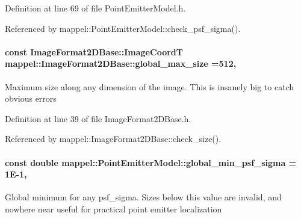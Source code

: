 Definition at line 69 of file Point\+Emitter\+Model.\+h.



Referenced by mappel\+::\+Point\+Emitter\+Model\+::check\+\_\+psf\+\_\+sigma().

\paragraph[{\texorpdfstring{global\+\_\+max\+\_\+size}{global_max_size}}]{\setlength{\rightskip}{0pt plus 5cm}const {\bf Image\+Format2\+D\+Base\+::\+Image\+CoordT} mappel\+::\+Image\+Format2\+D\+Base\+::global\+\_\+max\+\_\+size =512\hspace{0.3cm}{\ttfamily [static]}, {\ttfamily [inherited]}}\hypertarget{classmappel_1_1ImageFormat2DBase_a11c9bb87930f597dff17e9923b73bf5e}{}\label{classmappel_1_1ImageFormat2DBase_a11c9bb87930f597dff17e9923b73bf5e}
Maximum size along any dimension of the image. This is insanely big to catch obvious errors 

Definition at line 39 of file Image\+Format2\+D\+Base.\+h.



Referenced by mappel\+::\+Image\+Format2\+D\+Base\+::check\+\_\+size().

\paragraph[{\texorpdfstring{global\+\_\+min\+\_\+psf\+\_\+sigma}{global_min_psf_sigma}}]{\setlength{\rightskip}{0pt plus 5cm}const double mappel\+::\+Point\+Emitter\+Model\+::global\+\_\+min\+\_\+psf\+\_\+sigma = 1\+E-\/1\hspace{0.3cm}{\ttfamily [static]}, {\ttfamily [inherited]}}\hypertarget{classmappel_1_1PointEmitterModel_a77d0ca98d77cb8b94117ece2a5b182a4}{}\label{classmappel_1_1PointEmitterModel_a77d0ca98d77cb8b94117ece2a5b182a4}
Global minimum for any psf\+\_\+sigma. Sizes below this value are invalid, and nowhere near useful for practical point emitter localization 

